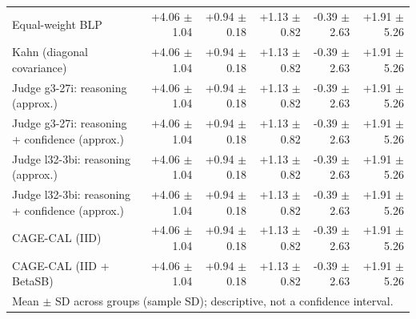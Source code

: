 \begin{tabular}{lrrrrr}
Equal-weight BLP & +4.06 {\scriptsize $\pm$ 1.04} & +0.94 {\scriptsize $\pm$ 0.18} & +1.13 {\scriptsize $\pm$ 0.82} & -0.39 {\scriptsize $\pm$ 2.63} & +1.91 {\scriptsize $\pm$ 5.26} \\
Kahn (diagonal covariance) & +4.06 {\scriptsize $\pm$ 1.04} & +0.94 {\scriptsize $\pm$ 0.18} & +1.13 {\scriptsize $\pm$ 0.82} & -0.39 {\scriptsize $\pm$ 2.63} & +1.91 {\scriptsize $\pm$ 5.26} \\
Judge g3-27i: reasoning (approx.) & +4.06 {\scriptsize $\pm$ 1.04} & +0.94 {\scriptsize $\pm$ 0.18} & +1.13 {\scriptsize $\pm$ 0.82} & -0.39 {\scriptsize $\pm$ 2.63} & +1.91 {\scriptsize $\pm$ 5.26} \\
Judge g3-27i: reasoning + confidence (approx.) & +4.06 {\scriptsize $\pm$ 1.04} & +0.94 {\scriptsize $\pm$ 0.18} & +1.13 {\scriptsize $\pm$ 0.82} & -0.39 {\scriptsize $\pm$ 2.63} & +1.91 {\scriptsize $\pm$ 5.26} \\
Judge l32-3bi: reasoning (approx.) & +4.06 {\scriptsize $\pm$ 1.04} & +0.94 {\scriptsize $\pm$ 0.18} & +1.13 {\scriptsize $\pm$ 0.82} & -0.39 {\scriptsize $\pm$ 2.63} & +1.91 {\scriptsize $\pm$ 5.26} \\
Judge l32-3bi: reasoning + confidence (approx.) & +4.06 {\scriptsize $\pm$ 1.04} & +0.94 {\scriptsize $\pm$ 0.18} & +1.13 {\scriptsize $\pm$ 0.82} & -0.39 {\scriptsize $\pm$ 2.63} & +1.91 {\scriptsize $\pm$ 5.26} \\
CAGE-CAL (IID) & +4.06 {\scriptsize $\pm$ 1.04} & +0.94 {\scriptsize $\pm$ 0.18} & +1.13 {\scriptsize $\pm$ 0.82} & -0.39 {\scriptsize $\pm$ 2.63} & +1.91 {\scriptsize $\pm$ 5.26} \\
CAGE-CAL (IID + BetaSB) & +4.06 {\scriptsize $\pm$ 1.04} & +0.94 {\scriptsize $\pm$ 0.18} & +1.13 {\scriptsize $\pm$ 0.82} & -0.39 {\scriptsize $\pm$ 2.63} & +1.91 {\scriptsize $\pm$ 5.26} \\
\bottomrule
\multicolumn{6}{l}{\scriptsize Mean $\pm$ SD across groups (sample SD); descriptive, not a confidence interval.} \\
\end{tabular}
